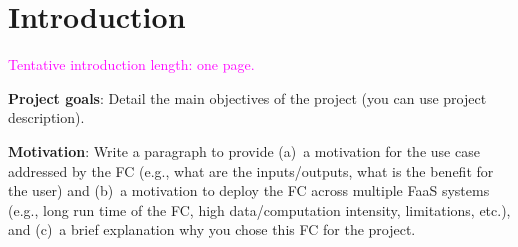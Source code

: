 %
%
%
\chapter{\label{chap:introduction}Introduction}

\textcolor{magenta}{Tentative introduction length: one page.}

\vspace{20 pt}

\textbf{Project goals}: Detail the main objectives of the project (you can use project description).

\vspace{20 pt}

\textbf{Motivation}: Write a paragraph to provide (a)~a motivation for the use case addressed by the FC (e.g., what are the inputs/outputs, what is the benefit for the user) and (b)~a motivation to deploy the FC across multiple FaaS systems (e.g., long run time of the FC, high data/computation intensity, limitations, etc.), and (c)~a brief explanation why you chose this FC for the project.

